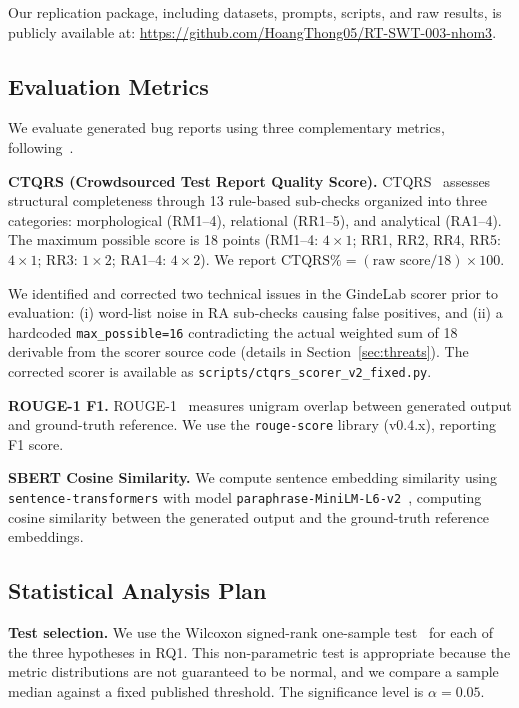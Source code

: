 Our replication package, including datasets, prompts,
scripts, and raw results, is publicly available at:
\url{https://github.com/HoangThong05/RT-SWT-003-nhom3}.

\subsection{Evaluation Metrics}
\label{sec:metrics}

We evaluate generated bug reports using three complementary
metrics, following~\cite{acharya2025bugquality}.

\textbf{CTQRS (Crowdsourced Test Report Quality Score).}
CTQRS~\cite{zhang2022ctqrs} assesses structural completeness
through 13 rule-based sub-checks organized into three
categories: morphological (RM1--4), relational (RR1--5),
and analytical (RA1--4). The maximum possible score is 18
points (RM1--4: $4\times1$; RR1, RR2, RR4, RR5: $4\times1$;
RR3: $1\times2$; RA1--4: $4\times2$). We report
$\text{CTQRS\%} = (\text{raw score} / 18) \times 100$.

We identified and corrected two technical issues in the
GindeLab scorer prior to evaluation: (i) word-list noise in
RA sub-checks causing false positives, and (ii) a hardcoded
\texttt{max\_possible=16} contradicting the actual weighted
sum of 18 derivable from the scorer source code (details in
Section~\ref{sec:threats}). The corrected scorer is
available as \texttt{scripts/ctqrs\_scorer\_v2\_fixed.py}.

\textbf{ROUGE-1 F1.}
ROUGE-1~\cite{lin2004rouge} measures unigram overlap between
generated output and ground-truth reference. We use the
\texttt{rouge-score} library (v0.4.x), reporting F1 score.

\textbf{SBERT Cosine Similarity.}
We compute sentence embedding similarity using
\texttt{sentence-transformers} with model
\texttt{paraphrase-MiniLM-L6-v2}~\cite{acharya2025bugquality},
computing cosine similarity between the generated output and
the ground-truth reference embeddings.

\subsection{Statistical Analysis Plan}
\label{sec:stats}

\textbf{Test selection.}
We use the Wilcoxon signed-rank one-sample
test~\cite{arcuri2011practical} for each of the three
hypotheses in RQ1. This non-parametric test is appropriate
because the metric distributions are not guaranteed to be
normal, and we compare a sample median against a fixed
published threshold. The significance level is $\alpha = 0.05$.

